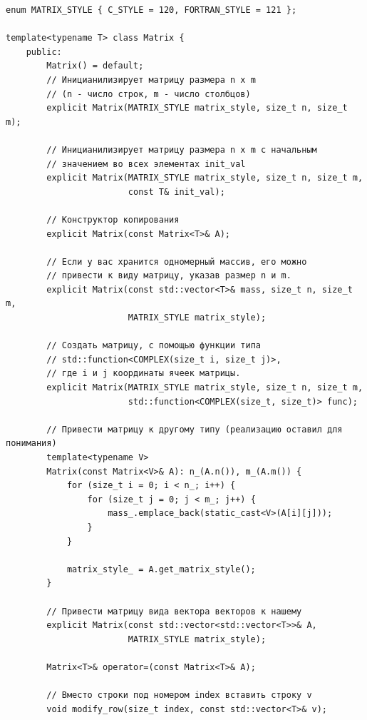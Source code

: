 \documentclass[12pt,fleqn]{article}
\begin{document}
            \begin{mdframed}[linecolor=black, topline=true, bottomline=true,
                leftline=false, rightline=false]
            \begin{verbatim}
enum MATRIX_STYLE { C_STYLE = 120, FORTRAN_STYLE = 121 };

template<typename T> class Matrix {
    public:
        Matrix() = default;
        // Иницианилизирует матрицу размера n x m 
        // (n - число строк, m - число столбцов)
        explicit Matrix(MATRIX_STYLE matrix_style, size_t n, size_t m);
        
        // Иницианилизирует матрицу размера n x m с начальным 
        // значением во всех элементах init_val
        explicit Matrix(MATRIX_STYLE matrix_style, size_t n, size_t m,
                        const T& init_val);

        // Конструктор копирования
        explicit Matrix(const Matrix<T>& A);

        // Если у вас хранится одномерный массив, его можно 
        // привести к виду матрицу, указав размер n и m.
        explicit Matrix(const std::vector<T>& mass, size_t n, size_t m, 
                        MATRIX_STYLE matrix_style);

        // Создать матрицу, с помощью функции типа
        // std::function<COMPLEX(size_t i, size_t j)>, 
        // где i и j координаты ячеек матрицы.
        explicit Matrix(MATRIX_STYLE matrix_style, size_t n, size_t m, 
                        std::function<COMPLEX(size_t, size_t)> func);

        // Привести матрицу к другому типу (реализацию оставил для понимания)
        template<typename V>
        Matrix(const Matrix<V>& A): n_(A.n()), m_(A.m()) {
            for (size_t i = 0; i < n_; i++) {
                for (size_t j = 0; j < m_; j++) {
                    mass_.emplace_back(static_cast<V>(A[i][j]));
                }
            }

            matrix_style_ = A.get_matrix_style();
        }

        // Привести матрицу вида вектора векторов к нашему
        explicit Matrix(const std::vector<std::vector<T>>& A, 
                        MATRIX_STYLE matrix_style);

        Matrix<T>& operator=(const Matrix<T>& A);

        // Вместо строки под номером index вставить строку v
        void modify_row(size_t index, const std::vector<T>& v);


\end{verbatim}
\end{mdframed}
\end{document}
